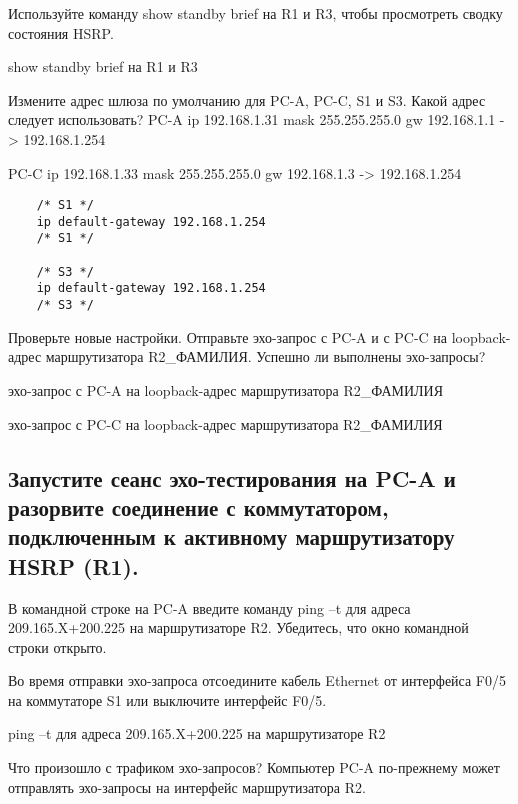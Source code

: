 Используйте команду show standby brief на R1 и R3, чтобы просмотреть сводку состояния HSRP.

\begin{image}
    \caption{show standby brief на R1 и R3}
\end{image}
Измените адрес шлюза по умолчанию для PC-A, PC-C, S1 и S3. Какой адрес следует использовать?
PC-A
ip 192.168.1.31
mask 255.255.255.0
gw 192.168.1.1 -> 192.168.1.254

PC-C
ip 192.168.1.33
mask 255.255.255.0
gw 192.168.1.3 -> 192.168.1.254

\begin{verbatim}
    /* S1 */
    ip default-gateway 192.168.1.254
    /* S1 */

    /* S3 */
    ip default-gateway 192.168.1.254
    /* S3 */
\end{verbatim}

Проверьте новые настройки.
Отправьте эхо-запрос с PC-A и с PC-C на loopback-адрес маршрутизатора R2\_ФАМИЛИЯ.
Успешно ли выполнены эхо-запросы?

\begin{image}
    \caption{эхо-запрос с PC-A на loopback-адрес маршрутизатора R2\_ФАМИЛИЯ}
\end{image}

\begin{image}
    \caption{эхо-запрос с PC-C на loopback-адрес маршрутизатора R2\_ФАМИЛИЯ}
\end{image}

\subsection{Запустите сеанс эхо-тестирования на PC-A и разорвите соединение
с коммутатором, подключенным к активному маршрутизатору HSRP (R1).}

В командной строке на PC-A введите команду ping –t для адреса 209.165.X+200.225
на маршрутизаторе R2. Убедитесь, что окно командной строки открыто.

Во время отправки эхо-запроса отсоедините кабель Ethernet от интерфейса F0/5 на коммутаторе S1 или
выключите интерфейс F0/5.
\begin{image}
    \caption{ping –t для адреса 209.165.X+200.225
    на маршрутизаторе R2}
\end{image}

Что произошло с трафиком эхо-запросов?
Компьютер PC-A по-прежнему может отправлять эхо-запросы на интерфейс маршрутизатора R2.


